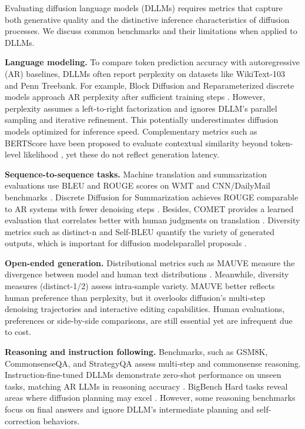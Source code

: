 Evaluating diffusion language models (DLLMs) requires metrics that capture both generative quality and the distinctive inference characteristics of diffusion processes. We discuss common benchmarks and their limitations when applied to DLLMs.



\noindent\textbf{Language modeling.}  To compare token prediction accuracy with autoregressive (AR) baselines, DLLMs often report perplexity on datasets like WikiText-103 and Penn Treebank.  For example, Block Diffusion and Reparameterized discrete models approach AR perplexity after sufficient training steps \cite{arriola_block_2025, zheng_reparameterized_2024}.  However, perplexity assumes a left-to-right factorization and ignores DLLM’s parallel sampling and iterative refinement. This potentially underestimates diffusion models optimized for inference speed.  Complementary metrics such as BERTScore have been proposed to evaluate contextual similarity beyond token-level likelihood \cite{zhang_bertscore_2019}, yet these do not reflect generation latency.



\noindent\textbf{Sequence-to-sequence tasks.}  Machine translation and summarization evaluations use BLEU and ROUGE scores on WMT and CNN/DailyMail benchmarks \cite{papineni_bleu_2002, lin_rouge_2004}.  Discrete Diffusion for Summarization achieves ROUGE comparable to AR systems with fewer denoising steps \cite{dat_discrete_2025}. Besides, COMET provides a learned evaluation that correlates better with human judgments on translation \cite{rei_comet_2020}.  Diversity metrics such as distinct-n and Self-BLEU quantify the variety of generated outputs, which is important for diffusion modelsparallel proposals \cite{li_diversity_2016}.



\noindent\textbf{Open-ended generation.}  Distributional metrics such as MAUVE measure the divergence between model and human text distributions \cite{pillutla_mauve_2021}. Meanwhile, diversity measures (distinct-1/2) assess intra-sample variety.  MAUVE better reflects human preference than perplexity, but it overlooks diffusion’s multi-step denoising trajectories and interactive editing capabilities.  Human evaluations, preferences or side-by-side comparisons, are still essential yet are infrequent due to cost.



\noindent\textbf{Reasoning and instruction following.}  Benchmarks, such as GSM8K, CommonsenseQA, and StrategyQA assess multi-step and commonsense reasoning.  Instruction-fine-tuned DLLMs demonstrate zero-shot performance on unseen tasks, matching AR LLMs in reasoning accuracy \cite{zhao_d1_2025}. BigBench Hard tasks reveal areas where diffusion planning may excel \cite{srivastava_bigbench_2022}.  However, some reasoning benchmarks focus on final answers and ignore DLLM’s intermediate planning and self-correction behaviors.



